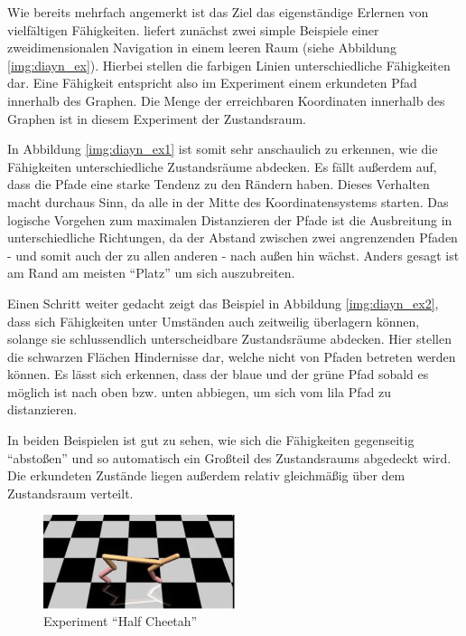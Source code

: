 Wie bereits mehrfach angemerkt ist das Ziel das eigenständige Erlernen von vielfältigen Fähigkeiten. \cite{diversity_eysenbach} liefert zunächst zwei simple Beispiele einer zweidimensionalen Navigation in einem leeren Raum (siehe Abbildung \ref{img:diayn_ex}). Hierbei stellen die farbigen Linien unterschiedliche Fähigkeiten dar. Eine Fähigkeit entspricht also im Experiment einem erkundeten Pfad innerhalb des Graphen. Die Menge der erreichbaren Koordinaten innerhalb des Graphen ist in diesem Experiment der Zustandsraum.

In Abbildung \ref{img:diayn_ex1} ist somit sehr anschaulich zu erkennen, wie die Fähigkeiten unterschiedliche Zustandsräume abdecken. Es fällt außerdem auf, dass die Pfade eine starke Tendenz zu den Rändern haben. Dieses Verhalten macht durchaus Sinn, da alle in der Mitte des Koordinatensystems starten. Das logische Vorgehen zum maximalen Distanzieren der Pfade ist die Ausbreitung in unterschiedliche Richtungen, da der Abstand zwischen zwei angrenzenden Pfaden - und somit auch der zu allen anderen - nach außen hin wächst. Anders gesagt ist am Rand am meisten ``Platz'' um sich auszubreiten.

Einen Schritt weiter gedacht zeigt das Beispiel in Abbildung \ref{img:diayn_ex2}, dass sich Fähigkeiten unter Umständen auch zeitweilig überlagern können, solange sie schlussendlich unterscheidbare Zustandsräume abdecken. Hier stellen die schwarzen Flächen Hindernisse dar, welche nicht von Pfaden betreten werden können. Es lässt sich erkennen, dass der blaue und der grüne Pfad sobald es möglich ist nach oben bzw. unten abbiegen, um sich vom lila Pfad zu distanzieren.

\smallspace

In beiden Beispielen ist gut zu sehen, wie sich die Fähigkeiten gegenseitig ``abstoßen'' und so automatisch ein Großteil des Zustandsraums abgedeckt wird. Die erkundeten Zustände liegen außerdem relativ gleichmäßig über dem Zustandsraum verteilt.

\smallspace

\begin{figure}[h]
\includegraphics[width=0.5\textwidth, keepaspectratio=true, center]{images/cheetah_image.JPG}
\caption{Experiment ``Half Cheetah''} \label{img:cheetah_ex}
\end{figure}

